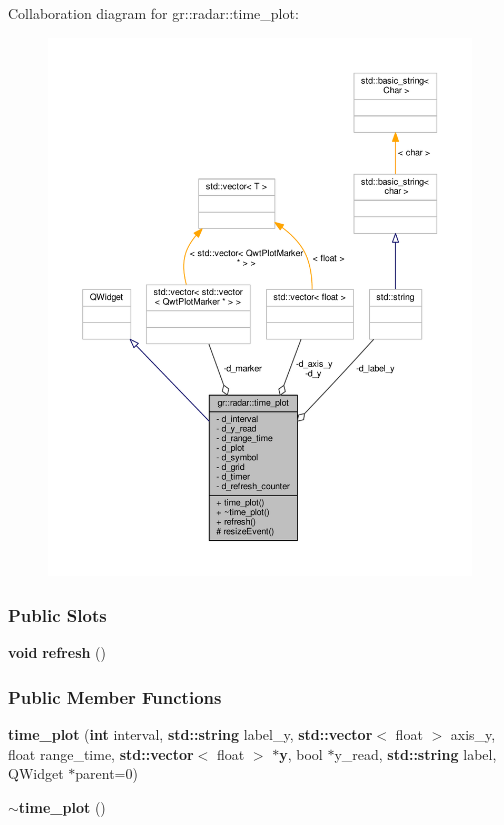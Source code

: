 Collaboration diagram for gr\+:\+:radar\+:\+:time\+\_\+plot\+:
\nopagebreak
\begin{figure}[H]
\begin{center}
\leavevmode
\includegraphics[width=350pt]{d1/d1f/classgr_1_1radar_1_1time__plot__coll__graph}
\end{center}
\end{figure}
\subsubsection*{Public Slots}
\begin{DoxyCompactItemize}
\item 
{\bf void} {\bf refresh} ()
\end{DoxyCompactItemize}
\subsubsection*{Public Member Functions}
\begin{DoxyCompactItemize}
\item 
{\bf time\+\_\+plot} ({\bf int} interval, {\bf std\+::string} label\+\_\+y, {\bf std\+::vector}$<$ float $>$ axis\+\_\+y, float range\+\_\+time, {\bf std\+::vector}$<$ float $>$ $\ast${\bf y}, bool $\ast$y\+\_\+read, {\bf std\+::string} label, Q\+Widget $\ast$parent=0)
\item 
{\bf $\sim$time\+\_\+plot} ()
\end{DoxyCompactItemize}
